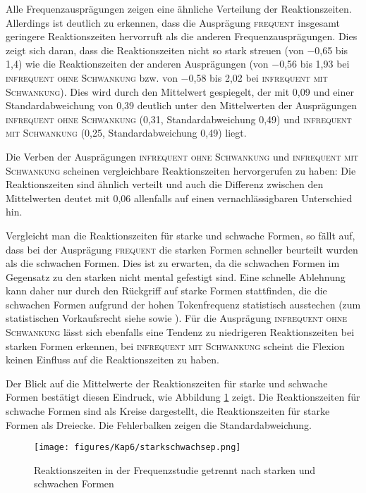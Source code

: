 Alle Frequenzausprägungen zeigen eine ähnliche Verteilung der Reaktionszeiten. Allerdings ist deutlich zu erkennen, dass die Ausprägung \textsc{frequent} insgesamt geringere Reaktionszeiten hervorruft als die anderen Frequenzausprägungen. Dies zeigt sich daran, dass die Reaktionszeiten nicht so stark streuen (von −0,65 bis 1,4) wie die Reaktionszeiten der anderen Ausprägungen (von −0,56 bis 1,93 bei \textsc{infrequent ohne Schwankung} bzw. von −0,58 bis 2,02 bei \textsc{infrequent mit Schwankung}). Dies wird durch den Mittelwert gespiegelt, der mit 0,09 und einer Standardabweichung von 0,39 deutlich unter den Mittelwerten der Ausprägungen \textsc{infrequent ohne Schwankung} (0,31, Standardabweichung 0,49) und \textsc{infrequent mit Schwankung} (0,25, Standardabweichung 0,49) liegt. 

Die Verben der Ausprägungen \textsc{infrequent ohne Schwankung} und \textsc{infrequent mit Schwankung} scheinen vergleichbare Reaktionszeiten hervorgerufen zu haben: Die Reak\-tionszeiten sind ähnlich verteilt und auch die Differenz zwischen den Mittelwerten deutet mit 0,06 allenfalls auf einen vernachlässigbaren Unterschied hin.

Vergleicht man die Reaktionszeiten für starke und schwache Formen, so fällt auf, dass bei der Ausprägung \textsc{frequent} die starken Formen schneller beurteilt wurden als die schwachen Formen. Dies ist zu erwarten, da die schwachen Formen im Gegensatz zu den starken nicht mental gefestigt sind. Eine schnelle Ablehnung kann daher nur durch den Rückgriff auf starke Formen stattfinden, die die schwachen Formen aufgrund der hohen Tokenfrequenz statistisch ausstechen (zum statistischen Vorkaufsrecht siehe \cite[74--94]{Goldberg.2019} sowie ). Für die Ausprägung \textsc{infrequent ohne Schwankung} lässt sich ebenfalls eine Tendenz zu niedrigeren Reaktionszeiten bei starken Formen erkennen, bei \textsc{infrequent mit Schwankung} scheint die Flexion keinen Einfluss auf die Reaktionszeiten zu haben. 

Der Blick auf die Mittelwerte der Reaktionszeiten für starke und schwache Formen bestätigt diesen Eindruck, wie Abbildung \ref{starkschwach} zeigt. Die Reaktionszeiten für schwache Formen sind als Kreise dargestellt, die Reaktionszeiten für starke Formen als Dreiecke. Die Fehlerbalken zeigen die Standardabweichung.

\begin{figure}
\texttt{[image: figures/Kap6/starkschwachsep.png]} 
\caption{Reaktionszeiten in der Frequenzstudie getrennt nach starken und schwachen Formen}
\label{starkschwach}
\end{figure}

